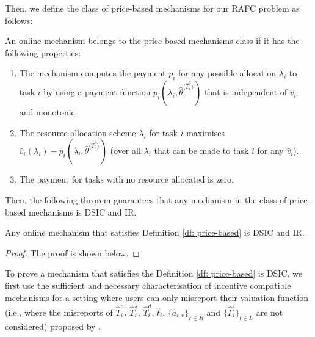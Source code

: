 \documentclass[11pt]{phdthesis}
\begin{document}
Then, we define the class of price-based mechanisms for our RAFC problem as follows:

\begin{definition}\label{df: price-based}
    An online mechanism belongs to the price-based mechanisms class if it has the following properties:
    \begin{enumerate}
        \item The mechanism computes the payment $ p_i$ for any possible allocation $ \lambda_i $ to task $i$ by using a payment function $p_i(\lambda_i, \hat{\theta}^{\langle \hat{T}_i^a \rangle})$ that is independent of $\hat{v}_i$ and monotonic.
        \item The resource allocation scheme $\lambda_i$ for task $ i $ maximises $ \hat{v}_i(\lambda_i) - p_i(\lambda_i, \hat{\theta}^{\langle \hat{T}_i^a \rangle})$ (over all $\lambda_i$ that can be made to task $i$ for any $\hat{v}_i$).
        \item The payment for tasks with no resource allocated is zero.
    \end{enumerate}
\end{definition}

Then, the following theorem guarantees that any mechanism in the class of price-based mechanisms is DSIC and IR.

\begin{theorem}\label{th: DSICandIR}
    Any online mechanism that satisfies Definition \ref{df: price-based} is DSIC and IR.
\end{theorem}

\begin{proof}
    The proof is shown below.
\end{proof}

To prove a mechanism that satisfies the Definition \ref{df: price-based} is DSIC, we first use the sufficient and necessary characterisation of incentive compatible mechanisms for a setting where users can only misreport their valuation function (i.e., where the misreports of $\hat{T}_i^a$, $\hat{T}_i^s$, $\hat{T}_i^d$, $ \hat{t}_i $, $ \{ \hat{a}_{i,r} \}_{r \in R} $ and $ \{ \hat{\Gamma}_l^i \}_{l \in L} $ are not considered) proposed by \citet{bartal2003incentive} .
\end{document}
